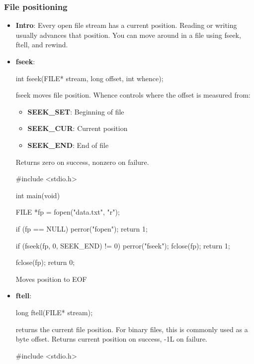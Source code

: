 \documentclass{report}
\begin{document}
    \subsubsection{File positioning}
    \begin{itemize}
        \item \textbf{Intro}: Every open file stream has a current position. Reading or writing usually advances that position.
            \bigbreak \noindent 
            You can move around in a file using fseek, ftell, and rewind.        
        \item \textbf{fseek}: 
            \bigbreak \noindent 
            \begin{cppcode}
                int fseek(FILE* stream, long offset, int whence);
            \end{cppcode}
            \bigbreak \noindent 
            fseek moves file position. Whence controls where the offset is measured from:
            \begin{itemize}
                \item \textbf{SEEK\_SET}: Beginning of file
                \item \textbf{SEEK\_CUR}: Current position
                \item \textbf{SEEK\_END}: End of file
            \end{itemize}
            Returns zero on success, nonzero on failure.
            \bigbreak \noindent 
            \begin{cppcode}
                #include <stdio.h>

                int main(void) {
                    FILE *fp = fopen("data.txt", "r");

                    if (fp == NULL) {
                        perror("fopen");
                        return 1;
                    }

                    if (fseek(fp, 0, SEEK_END) != 0) {
                        perror("fseek");
                        fclose(fp);
                        return 1;
                    }

                    fclose(fp);
                    return 0;
                }
            \end{cppcode}
            \bigbreak \noindent 
            Moves position to EOF
        \item \textbf{ftell}: 
            \bigbreak \noindent 
            \begin{cppcode}
            long ftell(FILE* stream);
            \end{cppcode}
            \bigbreak \noindent 
            returns the current file position. For binary files, this is commonly used as a byte offset.
            \bigbreak \noindent 
            Returns current position on success, -1L on failure.
            \bigbreak \noindent 
            \begin{cppcode}
            #include <stdio.h>


\end{cppcode}
\end{itemize}
\end{document}
